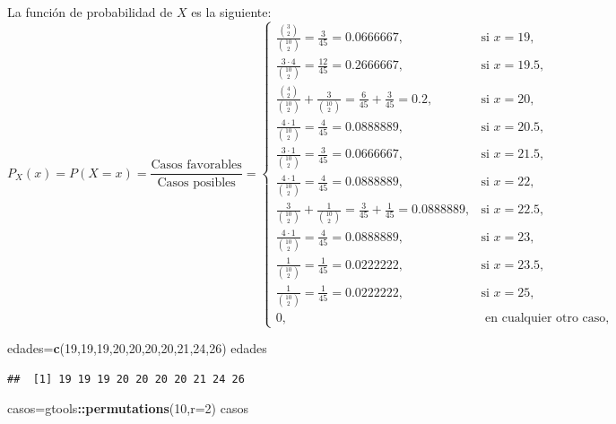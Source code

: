 \documentclass[
]{article}
\newenvironment{Shaded}{\begin{snugshade}}{\end{snugshade}}
\newcommand{\DataTypeTok}[1]{\textcolor[rgb]{0.13,0.29,0.53}{#1}}
\newcommand{\DecValTok}[1]{\textcolor[rgb]{0.00,0.00,0.81}{#1}}
\newcommand{\KeywordTok}[1]{\textcolor[rgb]{0.13,0.29,0.53}{\textbf{#1}}}
\newcommand{\NormalTok}[1]{#1}
\newcommand{\OperatorTok}[1]{\textcolor[rgb]{0.81,0.36,0.00}{\textbf{#1}}}
\begin{document}
La función de probabilidad de \(X\) es la siguiente: \[
P_X(x)=P(X=x)=\frac{\mbox{Casos favorables}}{\mbox{Casos posibles}}=
\left\{\begin{array}{ll}
\frac{\binom{3}{2}}{\binom{10}{2}}=\frac{3}{45}=0.0666667, & \mbox{si } x=19,
 \\[0.25cm]
\frac{3\cdot 4}{\binom{10}{2}}=\frac{12}{45}=0.2666667, & \mbox{si } x=19.5,
 \\[0.25cm]
 \frac{\binom{4}{2}}{\binom{10}{2}}+\frac{3}{\binom{10}{2}}=\frac{6}{45}+\frac{3}{45}=0.2, & \mbox{si } x=20,
 \\[0.25cm]
 \frac{4\cdot 1}{\binom{10}{2}}=\frac{4}{45}=0.0888889, & \mbox{si } x=20.5,
 \\[0.25cm]
 \frac{3\cdot 1}{\binom{10}{2}}=\frac{3}{45}=0.0666667, & \mbox{si } x=21.5,
 \\[0.25cm]
 \frac{4\cdot 1}{\binom{10}{2}}=\frac{4}{45}=0.0888889, & \mbox{si } x=22,
 \\[0.25cm]
 \frac{3}{\binom{10}{2}}+\frac{1}{\binom{10}{2}}=\frac{3}{45}+\frac{1}{45}=0.0888889, & \mbox{si } x=22.5,
 \\[0.25cm]
 \frac{4\cdot 1}{\binom{10}{2}}=\frac{4}{45}=0.0888889, & \mbox{si } x=23,
 \\[0.25cm]
 \frac{1}{\binom{10}{2}}=\frac{1}{45}=0.0222222, & \mbox{si } x=23.5,
 \\[0.25cm]
 \frac{1}{\binom{10}{2}}=\frac{1}{45}=0.0222222, & \mbox{si } x=25,
 \\[0.25cm]
0, & \mbox{ en cualquier otro caso},
\end{array}\right.
\]

\begin{Shaded}
\begin{Highlighting}[]
\NormalTok{edades=}\KeywordTok{c}\NormalTok{(}\DecValTok{19}\NormalTok{,}\DecValTok{19}\NormalTok{,}\DecValTok{19}\NormalTok{,}\DecValTok{20}\NormalTok{,}\DecValTok{20}\NormalTok{,}\DecValTok{20}\NormalTok{,}\DecValTok{20}\NormalTok{,}\DecValTok{21}\NormalTok{,}\DecValTok{24}\NormalTok{,}\DecValTok{26}\NormalTok{)}
\NormalTok{edades}
\end{Highlighting}
\end{Shaded}

\begin{verbatim}
##  [1] 19 19 19 20 20 20 20 21 24 26
\end{verbatim}

\begin{Shaded}
\begin{Highlighting}[]
\NormalTok{casos=gtools}\OperatorTok{::}\KeywordTok{permutations}\NormalTok{(}\DecValTok{10}\NormalTok{,}\DataTypeTok{r=}\DecValTok{2}\NormalTok{)}
\NormalTok{casos}
\end{Highlighting}
\end{Shaded}
\end{document}

